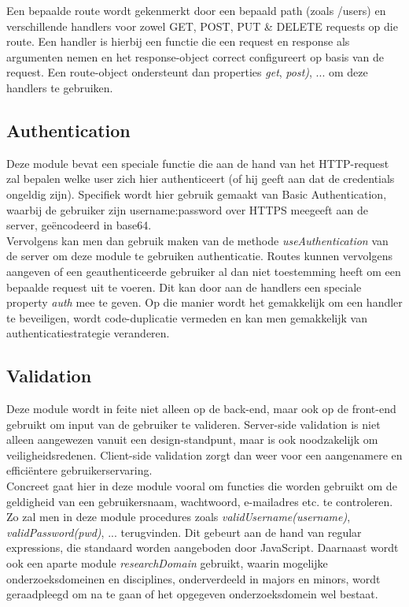 \documentclass{article}
\begin{document}
Een bepaalde route wordt gekenmerkt door een bepaald path (zoals /users) en verschillende handlers voor zowel GET, POST, PUT \& DELETE requests op die route. Een handler is hierbij een functie die een request en response als argumenten nemen en het response-object correct configureert op basis van de request. Een route-object ondersteunt dan properties \textit{get}, \textit{post)}, ... om deze handlers te gebruiken. 

\subsection{Authentication}

Deze module bevat een speciale functie die aan de hand van het HTTP-request zal bepalen welke user zich hier authenticeert (of hij geeft aan dat de credentials ongeldig zijn). Specifiek wordt hier gebruik gemaakt van Basic Authentication, waarbij de gebruiker zijn username:password over HTTPS meegeeft aan de server, ge\"encodeerd in base64.\\

Vervolgens kan men dan gebruik maken van de methode \textit{useAuthentication} van de server om deze module te gebruiken authenticatie. Routes kunnen vervolgens aangeven of een geauthenticeerde gebruiker al dan niet toestemming heeft om een bepaalde request uit te voeren. Dit kan door aan de handlers een speciale property \textit{auth} mee te geven. Op die manier wordt het gemakkelijk om een handler te beveiligen, wordt code-duplicatie vermeden en kan men gemakkelijk van authenticatiestrategie veranderen.

\subsection{Validation}

Deze module wordt in feite niet alleen op de back-end, maar ook op de front-end gebruikt om input van de gebruiker te valideren. Server-side validation is niet alleen aangewezen vanuit een design-standpunt, maar is ook noodzakelijk om veiligheidsredenen. Client-side validation zorgt dan weer voor een aangenamere en effici\"entere gebruikerservaring. \\

Concreet gaat hier in deze module vooral om functies die worden gebruikt om de geldigheid van een gebruikersnaam, wachtwoord, e-mailadres etc. te controleren. Zo zal men in deze module procedures zoals \textit{validUsername(username)}, \textit{validPassword(pwd)}, ... terugvinden. Dit gebeurt aan de hand van regular expressions, die standaard worden aangeboden door JavaScript. Daarnaast wordt ook een aparte module \textit{researchDomain} gebruikt, waarin mogelijke onderzoeksdomeinen en disciplines, onderverdeeld in majors en minors, wordt geraadpleegd om na te gaan of het opgegeven onderzoeksdomein wel bestaat.
\end{document}

